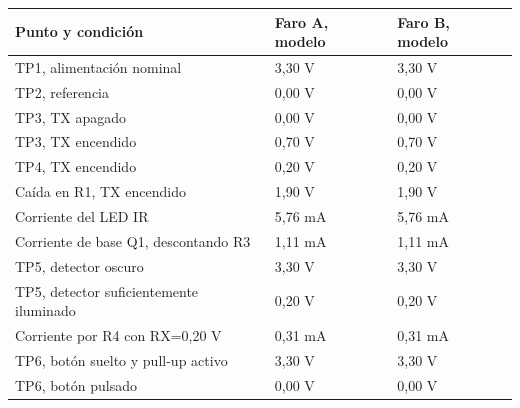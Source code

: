 {\small
\begin{longtable}{P{8cm} P{2.6cm} P{2.6cm}}
\toprule
Punto y condición & Faro A, modelo & Faro B, modelo\\
\midrule\endhead
TP1, alimentación nominal & 3,30 V & 3,30 V\\
TP2, referencia & 0,00 V & 0,00 V\\
TP3, TX apagado & 0,00 V & 0,00 V\\
TP3, TX encendido & 0,70 V & 0,70 V\\
TP4, TX encendido & 0,20 V & 0,20 V\\
Caída en R1, TX encendido & 1,90 V & 1,90 V\\
Corriente del LED IR & 5,76 mA & 5,76 mA\\
Corriente de base Q1, descontando R3 & 1,11 mA & 1,11 mA\\
TP5, detector oscuro & 3,30 V & 3,30 V\\
TP5, detector suficientemente iluminado & 0,20 V & 0,20 V\\
Corriente por R4 con RX=0,20 V & 0,31 mA & 0,31 mA\\
TP6, botón suelto y pull-up activo & 3,30 V & 3,30 V\\
TP6, botón pulsado & 0,00 V & 0,00 V\\
\bottomrule
\end{longtable}}
